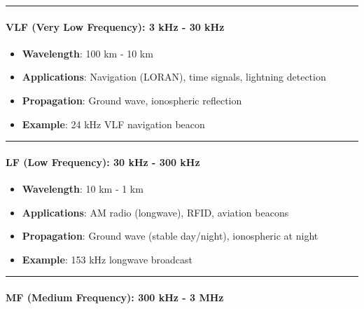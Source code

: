 \begin{center}\rule{0.5\linewidth}{0.5pt}\end{center}

\paragraph{\texorpdfstring{\textbf{VLF (Very Low Frequency): 3 kHz - 30
kHz}}{VLF (Very Low Frequency): 3 kHz - 30 kHz}}\label{vlf-very-low-frequency-3-khz---30-khz}

\begin{itemize}
\tightlist
\item
  \textbf{Wavelength}: 100 km - 10 km
\item
  \textbf{Applications}: Navigation (LORAN), time signals, lightning
  detection
\item
  \textbf{Propagation}: Ground wave, ionospheric reflection
\item
  \textbf{Example}: 24 kHz VLF navigation beacon
\end{itemize}

\begin{center}\rule{0.5\linewidth}{0.5pt}\end{center}

\paragraph{\texorpdfstring{\textbf{LF (Low Frequency): 30 kHz - 300
kHz}}{LF (Low Frequency): 30 kHz - 300 kHz}}\label{lf-low-frequency-30-khz---300-khz}

\begin{itemize}
\tightlist
\item
  \textbf{Wavelength}: 10 km - 1 km
\item
  \textbf{Applications}: AM radio (longwave), RFID, aviation beacons
\item
  \textbf{Propagation}: Ground wave (stable day/night), ionospheric at
  night
\item
  \textbf{Example}: 153 kHz longwave broadcast
\end{itemize}

\begin{center}\rule{0.5\linewidth}{0.5pt}\end{center}

\paragraph{\texorpdfstring{\textbf{MF (Medium Frequency): 300 kHz - 3
MHz}}{MF (Medium Frequency): 300 kHz - 3 MHz}}\label{mf-medium-frequency-300-khz---3-mhz}

